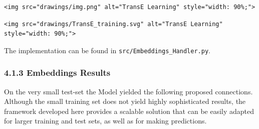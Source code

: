 \documentclass[
]{article}
\begin{document}
\begin{verbatim}
<img src="drawings/img.png" alt="TransE Learning" style="width: 90%;">
\end{verbatim}

\begin{verbatim}
<img src="drawings/TransE_training.svg" alt="TransE Learning" style="width: 90%;">
\end{verbatim}

The implementation can be found in \texttt{src/Embeddings\_Handler.py}.

\subsubsection{4.1.3 Embeddings Results}\label{embeddings-results}

On the very small test-set the Model yielded the following proposed
connections. Although the small training set does not yield highly
sophisticated results, the framework developed here provides a scalable
solution that can be easily adapted for larger training and test sets,
as well as for making predictions.
\end{document}
